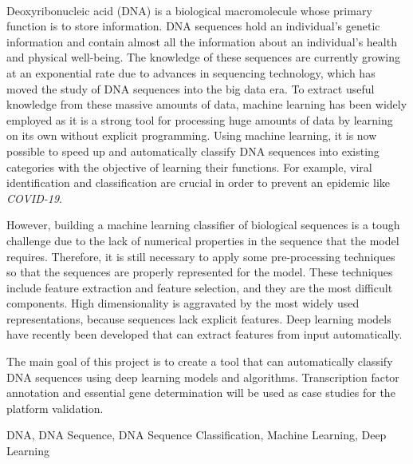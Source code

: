 {\large \textbf{\thetitle}}\\[1ex]
\noindent Deoxyribonucleic acid (DNA) is a biological macromolecule whose primary function is to store information. DNA sequences hold an individual's genetic information and contain almost all the information about an individual's health and physical well-being. The knowledge of these sequences are currently growing at an exponential rate due to advances in sequencing technology, which has moved the study of DNA sequences into the big data era. To extract useful knowledge from these massive amounts of data, machine learning has been widely employed as it is a strong tool for processing huge amounts of data by learning on its own without explicit programming. Using machine learning, it is now possible to speed up and automatically classify DNA sequences into existing categories with the objective of learning their functions. For example, viral identification and classification are crucial in order to prevent an epidemic like \emph{COVID-19}.

However, building a machine learning classifier of biological sequences is a tough challenge due to the lack of numerical properties in the sequence that the model requires. Therefore, it is still necessary to apply some pre-processing techniques so that the sequences are properly represented for the model. These techniques include feature extraction and feature selection, and they are the most difficult components. High dimensionality is aggravated by the most widely used representations, because sequences lack explicit features. Deep learning models have recently been developed that can extract features from input automatically.

The main goal of this project is to create a tool that can automatically classify DNA sequences using deep learning models and algorithms. Transcription factor annotation and essential gene determination will be used as case studies for the platform validation.

\begin{keywords}
DNA, DNA Sequence, DNA Sequence Classification, Machine Learning, Deep Learning
\end{keywords} 
